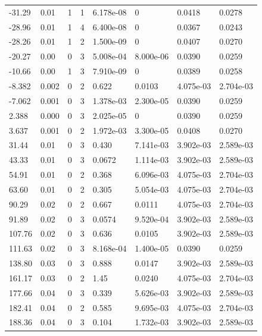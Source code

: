 \documentclass[preview]{standalone}
\begin{document}
{{\begin{tabular}{L{1.2cm}C{1.2cm} C{0.3cm}C{0.5cm} C{1.4cm}C{1.4cm} C{1.4cm}C{1.4cm}}
  -31.29  &  0.01  & 1     &  1 &  6.178e-08  & 0  & 0.0418 &  0.0278   \\ 
  -28.96  &  0.01  & 1     &  4 &  6.400e-08  & 0  & 0.0367 &  0.0243   \\ 
  -28.26  &  0.01  & 1     &  2 &  1.500e-09  & 0  & 0.0407 &  0.0270   \\ 
  -20.27  &  0.00  & 0     &  3 &  5.008e-04  & 8.000e-06  & 0.0390 &  0.0259   \\ 
  -10.66  &  0.00  & 1     &  3 &  7.910e-09  & 0  & 0.0389 &  0.0258   \\ 
  -8.382  &  0.002  & 0     &  2 &  0.622  & 0.0103  & 4.075e-03 &  2.704e-03   \\ 
  -7.062  &  0.001  & 0     &  3 &  1.378e-03  & 2.300e-05  & 0.0390 &  0.0259   \\ 
  2.388  &  0.000  & 0     &  3 &  2.025e-05  & 0  & 0.0390 &  0.0259   \\ 
  3.637  &  0.001  & 0     &  2 &  1.972e-03  & 3.300e-05  & 0.0408 &  0.0270   \\ 
  31.44  &  0.01  & 0     &  3 &  0.430  & 7.141e-03  & 3.902e-03 &  2.589e-03   \\ 
  43.33  &  0.01  & 0     &  3 &  0.0672  & 1.114e-03  & 3.902e-03 &  2.589e-03   \\ 
  54.91  &  0.01  & 0     &  2 &  0.368  & 6.096e-03  & 4.075e-03 &  2.704e-03   \\ 
  63.60  &  0.01  & 0     &  2 &  0.305  & 5.054e-03  & 4.075e-03 &  2.704e-03   \\ 
  90.29  &  0.02  & 0     &  2 &  0.667  & 0.0111  & 4.075e-03 &  2.704e-03   \\ 
  91.89  &  0.02  & 0     &  3 &  0.0574  & 9.520e-04  & 3.902e-03 &  2.589e-03   \\ 
  107.76  &  0.02  & 0     &  3 &  0.636  & 0.0105  & 3.902e-03 &  2.589e-03   \\ 
  111.63  &  0.02  & 0     &  3 &  8.168e-04  & 1.400e-05  & 0.0390 &  0.0259   \\ 
  138.80  &  0.03  & 0     &  3 &  0.888  & 0.0147  & 3.902e-03 &  2.589e-03   \\ 
  161.17  &  0.03  & 0     &  2 &  1.45  & 0.0240  & 4.075e-03 &  2.704e-03   \\ 
  177.66  &  0.04  & 0     &  3 &  0.339  & 5.626e-03  & 3.902e-03 &  2.589e-03   \\ 
  182.41  &  0.04  & 0     &  2 &  0.585  & 9.695e-03  & 4.075e-03 &  2.704e-03   \\ 
  188.36  &  0.04  & 0     &  3 &  0.104  & 1.732e-03  & 3.902e-03 &  2.589e-03   \\ 

\end{tabular}}}
\end{document}

